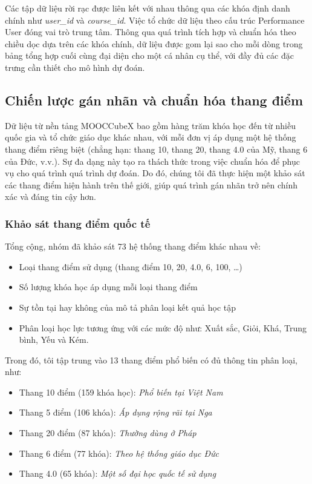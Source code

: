 Các tập dữ liệu rời rạc được liên kết với nhau thông qua các khóa định danh chính như \textit{user\_id} và \textit{course\_id}. Việc tổ chức dữ liệu theo cấu trúc Performance User đóng vai trò trung tâm. Thông qua quá trình tích hợp và chuẩn hóa theo chiều dọc dựa trên các khóa chính, dữ liệu được gom lại sao cho mỗi dòng trong bảng tổng hợp cuối cùng đại diện cho một cá nhân cụ thể, với đầy đủ các đặc trưng cần thiết cho mô hình dự đoán. 

\subsection{Chiến lược gán nhãn và chuẩn hóa thang điểm}
Dữ liệu từ nền tảng MOOCCubeX bao gồm hàng trăm khóa học đến từ nhiều quốc gia và tổ chức giáo dục khác nhau, với mỗi đơn vị áp dụng một hệ thống thang điểm riêng biệt (chẳng hạn: thang 10, thang 20, thang 4.0 của Mỹ, thang 6 của Đức, v.v.). Sự đa dạng này tạo ra thách thức trong việc chuẩn hóa để phục vụ cho quá trình quá trình dự đoán. Do đó, chúng tôi đã thực hiện một khảo sát các thang điểm hiện hành trên thế giới, giúp quá trình gán nhãn trở nên chính xác và đáng tin cậy hơn.

\subsubsection{Khảo sát thang điểm quốc tế}
Tổng cộng, nhóm đã khảo sát 73 hệ thống thang điểm khác nhau về: 
\begin{itemize}
    \item Loại thang điểm sử dụng (thang điểm 10, 20, 4.0, 6, 100, \ldots)
    \item Số lượng khóa học áp dụng mỗi loại thang điểm
    \item Sự tồn tại hay không của mô tả phân loại kết quả học tập
    \item Phân loại học lực tương ứng với các mức độ như: Xuất sắc, Giỏi, Khá, Trung bình, Yếu và Kém.
\end{itemize}

Trong đó, tôi tập trung vào 13 thang điểm phổ biến có đủ thông tin phân loại, như:

\begin{itemize}
    \item Thang 10 điểm (159 khóa học): 
    \textit{Phổ biến tại Việt Nam}
    
    \item Thang 5 điểm (106 khóa):
    \textit{Áp dụng rộng rãi tại Nga}

    \item Thang 20 điểm (87 khóa):
    \textit{Thường dùng ở Pháp}

    \item Thang 6 điểm (77 khóa):
    \textit{Theo hệ thống giáo dục Đức}

    \item Thang 4.0 (65 khóa):
    \textit{Một số đại học quốc tế sử dụng}
\end{itemize}


